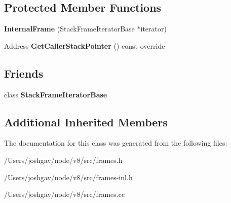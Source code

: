 \subsection*{Protected Member Functions}
\begin{DoxyCompactItemize}
\item 
{\bfseries Internal\+Frame} (Stack\+Frame\+Iterator\+Base $\ast$iterator)\hypertarget{classv8_1_1internal_1_1_internal_frame_a9bdd4bb2a9b9f4806cd69cd78b11b438}{}\label{classv8_1_1internal_1_1_internal_frame_a9bdd4bb2a9b9f4806cd69cd78b11b438}

\item 
Address {\bfseries Get\+Caller\+Stack\+Pointer} () const  override\hypertarget{classv8_1_1internal_1_1_internal_frame_aeaa0736c13a154773b4517038610739f}{}\label{classv8_1_1internal_1_1_internal_frame_aeaa0736c13a154773b4517038610739f}

\end{DoxyCompactItemize}
\subsection*{Friends}
\begin{DoxyCompactItemize}
\item 
class {\bfseries Stack\+Frame\+Iterator\+Base}\hypertarget{classv8_1_1internal_1_1_internal_frame_ac7310421866976ca454bbe11c5f926c3}{}\label{classv8_1_1internal_1_1_internal_frame_ac7310421866976ca454bbe11c5f926c3}

\end{DoxyCompactItemize}
\subsection*{Additional Inherited Members}


The documentation for this class was generated from the following files\+:\begin{DoxyCompactItemize}
\item 
/\+Users/joshgav/node/v8/src/frames.\+h\item 
/\+Users/joshgav/node/v8/src/frames-\/inl.\+h\item 
/\+Users/joshgav/node/v8/src/frames.\+cc\end{DoxyCompactItemize}
